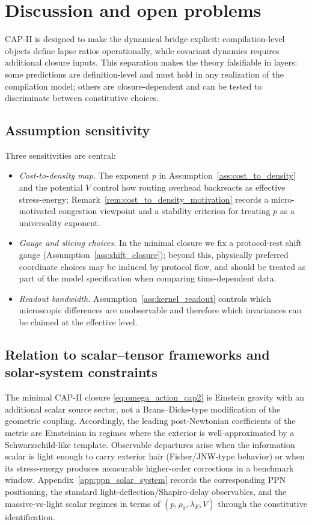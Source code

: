 \section{Discussion and open problems}
\label{sec:discussion}

CAP-II is designed to make the dynamical bridge explicit: compilation-level objects define lapse ratios operationally, while covariant dynamics requires additional closure inputs.
This separation makes the theory falsifiable in layers: some predictions are definition-level and must hold in any realization of the compilation model; others are closure-dependent and can be tested to discriminate between constitutive choices.

\subsection{Assumption sensitivity}
\label{subsec:assumption_sensitivity}

Three sensitivities are central:
\begin{itemize}
  \item \emph{Cost-to-density map.} The exponent $p$ in Assumption~\ref{ass:cost_to_density} and the potential $V$ control how routing overhead backreacts as effective stress-energy; Remark~\ref{rem:cost_to_density_motivation} records a micro-motivated congestion viewpoint and a stability criterion for treating $p$ as a universality exponent.
  \item \emph{Gauge and slicing choices.} In the minimal closure we fix a protocol-rest shift gauge (Assumption~\ref{ass:shift_closure}); beyond this, physically preferred coordinate choices may be induced by protocol flow, and should be treated as part of the model specification when comparing time-dependent data.
  \item \emph{Readout bandwidth.} Assumption~\ref{ass:kernel_readout} controls which microscopic differences are unobservable and therefore which invariances can be claimed at the effective level.
\end{itemize}

\subsection{Relation to scalar--tensor frameworks and solar-system constraints}
\label{subsec:relation_scalar_tensor_constraints}

The minimal CAP-II closure \eqref{eq:omega_action_cap2} is Einstein gravity with an additional scalar source sector, not a Brans--Dicke-type modification of the geometric coupling.
Accordingly, the leading post-Newtonian coefficients of the metric are Einsteinian in regimes where the exterior is well-approximated by a Schwarzschild-like template.
Observable departures arise when the information scalar is light enough to carry exterior hair (Fisher/JNW-type behavior) or when its stress-energy produces measurable higher-order corrections in a benchmark window.
Appendix~\ref{app:ppn_solar_system} records the corresponding PPN positioning, the standard light-deflection/Shapiro-delay observables, and the massive-vs-light scalar regimes in terms of $(p,\rho_0,\lambda_F,V)$ through the constitutive identification.


